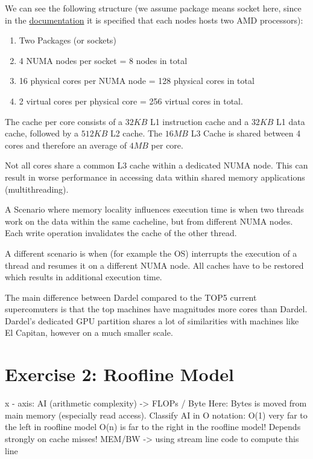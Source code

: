 \documentclass[a4paper,10pt]{article}
\begin{document}
We can see the following structure (we assume package means socket here, since in the \href{https://www.pdc.kth.se/hpc-services/computing-systems/dardel-hpc-system/about-the-dardel-system-1.1053338#:~:text=Each%20node%20has%20two%20AMD%20EPYC™%C2%A0Zen2%202.25%20GHz%2064%2Dcore%20processors%2C%20which%20means%20that%20each%20compute%20node%20has%20a%20total%20of%20128%20physical%20CPU%20cores}{documentation} it is specified that each nodes hosts two AMD processors):
\begin{enumerate}
  \item Two Packages (or sockets)
  \item 4 NUMA nodes per socket = 8 nodes in total
  \item 16 physical cores per NUMA node = 128 physical cores in total
  \item 2 virtual cores per physical core = 256 virtual cores in total.
\end{enumerate}
The cache per core consists of a $32 KB$ L1 instruction cache and a $32 KB$ L1 data cache, followed by a $512 KB$ L2 cache. The $16 MB$ L3 Cache is shared between 4 cores and therefore an average of $4MB$ per core.

Not all cores share a common L3 cache within a dedicated NUMA node.
This can result in worse performance in accessing data within shared memory applications (multithreading).

A Scenario where memory locality influences execution time is when two threads work on the data within the same cacheline, but from different NUMA nodes.
Each write operation invalidates the cache of the other thread.

A different scenario is when (for example the OS) interrupts the execution of a thread and resumes it on a different NUMA node.
All caches have to be restored which results in additional execution time.

The main difference between Dardel compared to the TOP5 current supercomuters is that the top machines have magnitudes more cores than Dardel.
Dardel's dedicated GPU partition shares a lot of similarities with machines like El Capitan, however on a much smaller scale.

\section{Exercise 2: Roofline Model}
x - axis: AI (arithmetic complexity) -> FLOPs / Byte
Here: Bytes is moved from main memory (especially read access).
Classify AI in O notation: O(1) very far to the left in roofline model
O(n) is far to the right in the roofline model!
Depends strongly on cache misses!
MEM/BW -> using stream line code to compute this line
\end{document}
